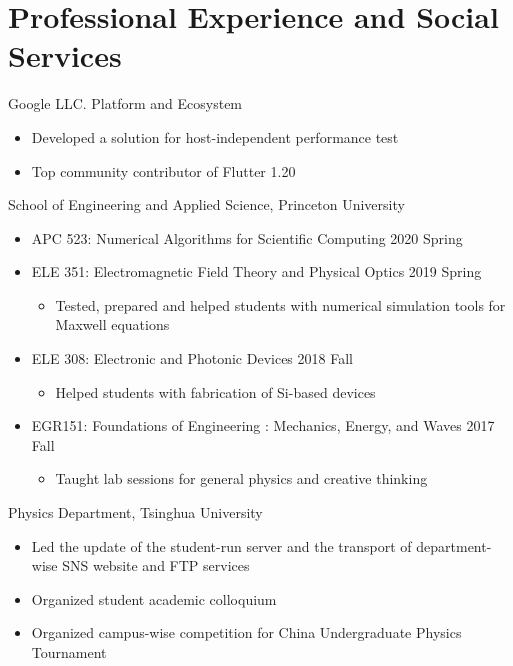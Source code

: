 \documentclass[11pt,letterpaper]{resume}
\begin{document}
\section{Professional Experience and Social Services}
Google LLC. Platform and Ecosystem
\begin{itemize}
    \item Developed a solution for host-independent performance test
    \item Top community contributor of Flutter 1.20
\end{itemize}\medskip
{}
School of Engineering and Applied Science, Princeton University
\begin{itemize}
    \item APC 523: Numerical Algorithms for Scientific Computing
    \hfill 2020 Spring
    \item ELE 351: Electromagnetic Field Theory and Physical Optics
    \hfill 2019 Spring
    \begin{itemize}
        \item Tested, prepared and helped students with 
        numerical simulation tools for Maxwell equations
    \end{itemize}
    \item ELE 308: Electronic and Photonic Devices
    \hfill 2018 Fall
    \begin{itemize}
        \item Helped students with fabrication of Si-based devices
    \end{itemize}
    \item EGR151: Foundations of Engineering : Mechanics, Energy, and Waves
    \hfill 2017 Fall
    \begin{itemize}
        \item Taught lab sessions for general physics and creative thinking
    \end{itemize}
\end{itemize}\medskip

Physics Department, Tsinghua University
\begin{itemize}
    \item Led the update of the student-run server and 
    the transport of department-wise SNS website and FTP services
    \item Organized student academic colloquium 
    \item Organized campus-wise competition for China Undergraduate Physics 
    Tournament
\end{itemize}\medskip
\end{document}
